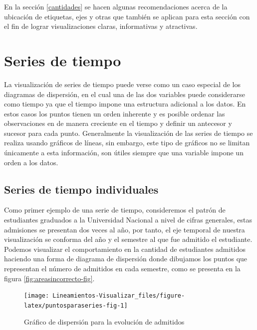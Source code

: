 \documentclass[
]{book}
\begin{document}
En la sección \ref{cantidades} se hacen algunas recomendaciones acerca de la ubicación de etiquetas, ejes y otras que también se aplican para esta sección con el fin de lograr visualizaciones claras, informativas y atractivas.

\hypertarget{series-de-tiempo}{%
\section{Series de tiempo}\label{series-de-tiempo}}

La visualización de series de tiempo puede verse como un caso especial de los diagramas de dispersión, en el cual una de las dos variables puede considerarse como tiempo ya que el tiempo impone una estructura adicional a los datos. En estos casos los puntos tienen un orden inherente y es posible ordenar las observaciones en de manera creciente en el tiempo y definir un antecesor y sucesor para cada punto. Generalmente la visualización de las series de tiempo se realiza usando gráficos de líneas, sin embargo, este tipo de gráficos no se limitan únicamente a esta información, son útiles siempre que una variable impone un orden a los datos.

\hypertarget{series-de-tiempo-individuales}{%
\subsection{Series de tiempo individuales}\label{series-de-tiempo-individuales}}

Como primer ejemplo de una serie de tiempo, consideremos el patrón de estudiantes graduados a la Universidad Nacional a nivel de cifras generales, estas admisiones se presentan dos veces al año, por tanto, el eje temporal de nuestra visualización se conforma del año y el semestre al que fue admitido el estudiante. Podemos visualizar el comportamiento en la cantidad de estudiantes admitidos haciendo una forma de diagrama de dispersión donde dibujamos los puntos que representan el número de admitidos en cada semestre, como se presenta en la figura \ref{fig:areasincorrecto-fig}.

\begin{figure}

{\centering \texttt{[image: Lineamientos-Visualizar\_files/figure-latex/puntosparaseries-fig-1]} 

}

\caption{Gráfico de dispersión para la evolución de admitidos}\label{fig:puntosparaseries-fig}
\end{figure}
\end{document}
